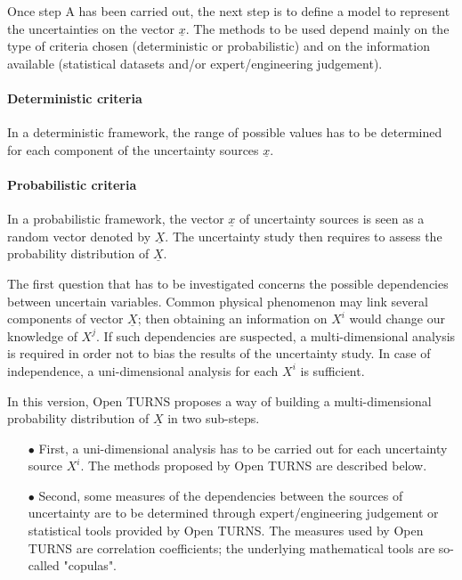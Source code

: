 Once step A has been carried out, the next step is to define a model to represent the uncertainties on the vector $\underline{x}$. The methods to be used depend mainly on the type of criteria chosen (deterministic or probabilistic) and on the information available (statistical datasets and/or expert/engineering judgement).

\paragraph{Deterministic criteria}
\par

In a deterministic framework, the range of possible values has to be determined for each component of the uncertainty sources $\underline{x}$.

\paragraph{Probabilistic criteria}
\par

In a probabilistic framework, the vector $\underline{x}$ of uncertainty sources is seen as a random vector denoted by $\underline{X}$. The uncertainty study then requires to assess the probability distribution of $\underline{X}$.

The first question that has to be investigated concerns the possible dependencies between uncertain variables. Common physical phenomenon may link several components of vector $\underline{X}$; then obtaining an information on $X^i$ would change our knowledge of $X^j$. If such dependencies are suspected, a multi-dimensional analysis is required in order not to bias the results of the uncertainty study. In case of independence, a uni-dimensional analysis for each $X^i$ is sufficient.

In this version, Open TURNS proposes a way of building a multi-dimensional probability distribution of $\underline{X}$ in two sub-steps.

\begin{itemize}

\item[$\bullet$] First, a uni-dimensional analysis has to be carried out for each uncertainty source $X^i$. The methods proposed by Open TURNS are described below.

\item[$\bullet$] Second, some measures of the dependencies between the sources of uncertainty are to be determined through expert/engineering judgement or statistical tools provided by Open TURNS. The measures used by Open TURNS are correlation coefficients; the underlying mathematical tools are so-called "copulas".

\end{itemize}

